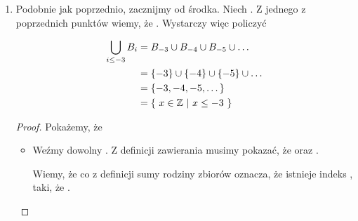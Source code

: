 \begin{example}
\begin{enumerate}
\begin{proof}
\begin{itemize}
        Weźmy dowolny . Z definicji zawierania musimy pokazać, że , to znaczy, że dla każdego indeksu , .
        
        Weźmy więc dowolny indeks . Wiemy, że , co znaczy, że  oraz . Skoro  i , to .
        
        Skoro  oraz , to  więc .
    \end{itemize}
    \end{proof}
    
    \item {}
    
    Podobnie jak poprzednio, zacznijmy od środka. Niech . Z jednego z poprzednich punktów wiemy, że . Wystarczy więc policzyć 
    
    \[
    \begin{split}
        \bigcup\limits_{i \leq -3} B_i
        &= B_{-3} \cup B_{-4} \cup B_{-5} \cup \dots
        \\&= \{ -3 \} \cup \{ -4 \} \cup \{ -5 \} \cup \dots
        \\&= \{ -3,-4,-5,\dots \}
        \\&= \{\ x \in \mathbb{Z}\ |\ x \leq -3\ \}
    \end{split}
    \]
    
    \begin{proof}
    Pokażemy, że 
    
    \begin{itemize}
        \item {}
        
        Weźmy dowolny . Z definicji zawierania musimy pokazać, że  oraz .
        
        Wiemy, że  co z definicji sumy rodziny zbiorów oznacza, że istnieje indeks ,  taki, że .
        

\end{itemize}
\end{proof}
\end{enumerate}
\end{example}
